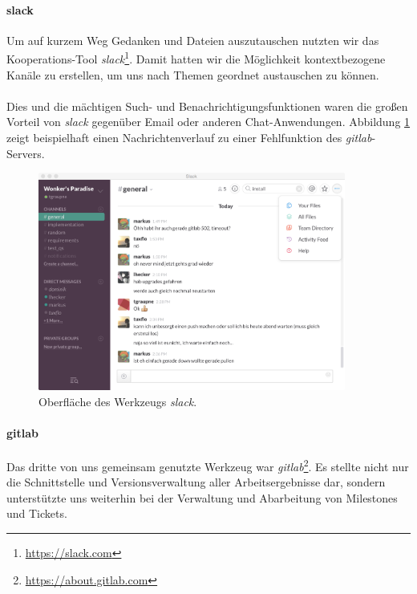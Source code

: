\newpage
\hspace*{2cm}
\paragraph{slack}Um auf kurzem Weg Gedanken und Dateien auszutauschen nutzten wir das Kooperations-Tool \textit{slack}\footnote{\url{https://slack.com}}. Damit hatten wir die Möglichkeit kontextbezogene Kanäle zu erstellen, um uns nach Themen geordnet austauschen zu können.

\paragraph{}Dies und die mächtigen Such- und Benachrichtigungsfunktionen waren die großen Vorteil von \textit{slack} gegenüber Email oder anderen Chat-Anwendungen. Abbildung \ref{slack} zeigt beispielhaft einen Nachrichtenverlauf zu einer Fehlfunktion des \textit{gitlab}-Servers.

\hspace*{2cm}
\begin{figure}[h!]
	\centering
	\includegraphics[width=0.9\textwidth]{images/slack.png}
	\caption{Oberfläche des Werkzeugs \textit{slack}.}
	\label{slack}
\end{figure}

\newpage
\paragraph{gitlab}Das dritte von uns gemeinsam genutzte Werkzeug war \textit{gitlab}\footnote{\url{https://about.gitlab.com}}. Es stellte nicht nur die Schnittstelle und Versionsverwaltung aller Arbeitsergebnisse dar, sondern unterstützte uns weiterhin bei der Verwaltung und Abarbeitung von Milestones und Tickets.

